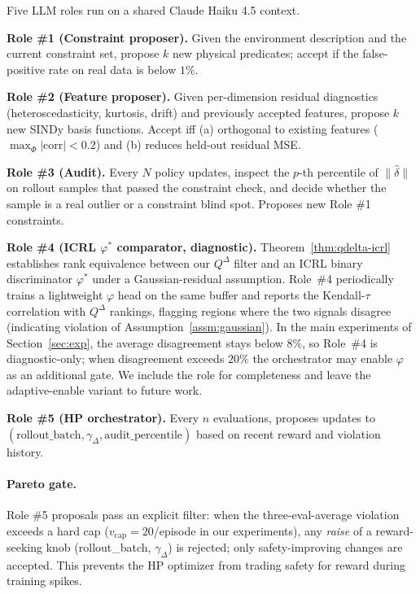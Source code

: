 \documentclass{article}
\theoremstyle{definition}
\newcommand{\QD}{Q^{\Delta}}
\begin{document}
Five LLM roles run on a shared Claude Haiku 4.5 context.

\textbf{Role \#1 (Constraint proposer).}  Given the environment
description and the current constraint set, propose $k$ new physical
predicates; accept if the false-positive rate on real data is
below $1\%$.

\textbf{Role \#2 (Feature proposer).}  Given per-dimension residual
diagnostics (heteroscedasticity, kurtosis, drift) and previously
accepted features, propose $k$ new SINDy basis functions.  Accept iff
(a) orthogonal to existing features ($\max_\Phi |\mathrm{corr}| < 0.2$)
and (b) reduces held-out residual MSE.

\textbf{Role \#3 (Audit).}  Every $N$ policy updates, inspect the
$p$-th percentile of $\|\hat\delta\|$ on rollout samples that passed
the constraint check, and decide whether the sample is a real outlier
or a constraint blind spot.  Proposes new Role \#1 constraints.

\textbf{Role \#4 (ICRL $\varphi^*$ comparator, diagnostic).}
Theorem~\ref{thm:qdelta-icrl} establishes rank equivalence between our
$\QD$ filter and an ICRL binary discriminator $\varphi^*$ under a
Gaussian-residual assumption.  Role~\#4 periodically trains a lightweight
$\varphi$ head on the same buffer and reports the Kendall-$\tau$
correlation with $\QD$ rankings, flagging regions where the two signals
disagree (indicating violation of
Assumption~\ref{assm:gaussian}).  In the main experiments of
Section~\ref{sec:exp}, the average disagreement stays below $8\%$, so
Role~\#4 is diagnostic-only; when disagreement exceeds $20\%$ the
orchestrator may enable $\varphi$ as an additional gate.  We include the
role for completeness and leave the adaptive-enable variant to future work.

\textbf{Role \#5 (HP orchestrator).}  Every $n$ evaluations, proposes
updates to $(\text{rollout\_batch},\gamma_\Delta,\text{audit\_percentile})$
based on recent reward and violation history.

\paragraph{Pareto gate.}  Role \#5 proposals pass an explicit filter:
when the three-eval-average violation exceeds a hard cap
($v_{\mathrm{cap}}=20$/episode in our experiments), any \emph{raise} of a
reward-seeking knob (rollout\_batch, $\gamma_\Delta$) is rejected; only
safety-improving changes are accepted.  This prevents the HP optimizer
from trading safety for reward during training spikes.
\end{document}
